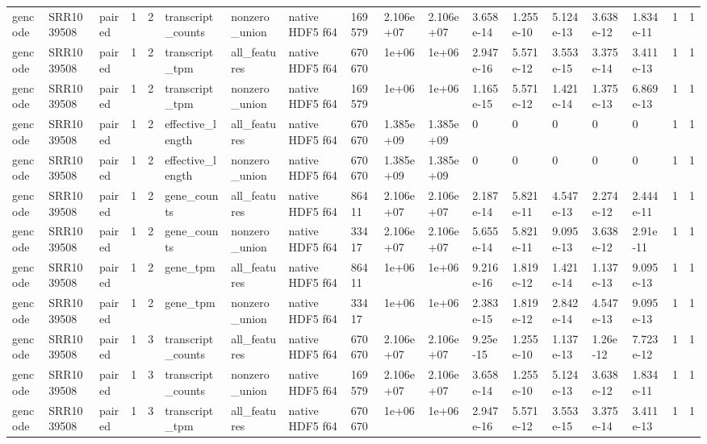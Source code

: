 \begin{tabular}{llllllllllllllllll}
gencode & SRR1039508 & paired & 1 & 2 & transcript\_counts & nonzero\_union & native HDF5 f64 & 169579 & 2.106e+07 & 2.106e+07 & 3.658e-14 & 1.255e-10 & 5.124e-13 & 3.638e-12 & 1.834e-11 & 1 & 1 \\
gencode & SRR1039508 & paired & 1 & 2 & transcript\_tpm & all\_features & native HDF5 f64 & 670670 & 1e+06 & 1e+06 & 2.947e-16 & 5.571e-12 & 3.553e-15 & 3.375e-14 & 3.411e-13 & 1 & 1 \\
gencode & SRR1039508 & paired & 1 & 2 & transcript\_tpm & nonzero\_union & native HDF5 f64 & 169579 & 1e+06 & 1e+06 & 1.165e-15 & 5.571e-12 & 1.421e-14 & 1.375e-13 & 6.869e-13 & 1 & 1 \\
gencode & SRR1039508 & paired & 1 & 2 & effective\_length & all\_features & native HDF5 f64 & 670670 & 1.385e+09 & 1.385e+09 & 0 & 0 & 0 & 0 & 0 & 1 & 1 \\
gencode & SRR1039508 & paired & 1 & 2 & effective\_length & nonzero\_union & native HDF5 f64 & 670670 & 1.385e+09 & 1.385e+09 & 0 & 0 & 0 & 0 & 0 & 1 & 1 \\
gencode & SRR1039508 & paired & 1 & 2 & gene\_counts & all\_features & native HDF5 f64 & 86411 & 2.106e+07 & 2.106e+07 & 2.187e-14 & 5.821e-11 & 4.547e-13 & 2.274e-12 & 2.444e-11 & 1 & 1 \\
gencode & SRR1039508 & paired & 1 & 2 & gene\_counts & nonzero\_union & native HDF5 f64 & 33417 & 2.106e+07 & 2.106e+07 & 5.655e-14 & 5.821e-11 & 9.095e-13 & 3.638e-12 & 2.91e-11 & 1 & 1 \\
gencode & SRR1039508 & paired & 1 & 2 & gene\_tpm & all\_features & native HDF5 f64 & 86411 & 1e+06 & 1e+06 & 9.216e-16 & 1.819e-12 & 1.421e-14 & 1.137e-13 & 9.095e-13 & 1 & 1 \\
gencode & SRR1039508 & paired & 1 & 2 & gene\_tpm & nonzero\_union & native HDF5 f64 & 33417 & 1e+06 & 1e+06 & 2.383e-15 & 1.819e-12 & 2.842e-14 & 4.547e-13 & 9.095e-13 & 1 & 1 \\
gencode & SRR1039508 & paired & 1 & 3 & transcript\_counts & all\_features & native HDF5 f64 & 670670 & 2.106e+07 & 2.106e+07 & 9.25e-15 & 1.255e-10 & 1.137e-13 & 1.26e-12 & 7.723e-12 & 1 & 1 \\
gencode & SRR1039508 & paired & 1 & 3 & transcript\_counts & nonzero\_union & native HDF5 f64 & 169579 & 2.106e+07 & 2.106e+07 & 3.658e-14 & 1.255e-10 & 5.124e-13 & 3.638e-12 & 1.834e-11 & 1 & 1 \\
gencode & SRR1039508 & paired & 1 & 3 & transcript\_tpm & all\_features & native HDF5 f64 & 670670 & 1e+06 & 1e+06 & 2.947e-16 & 5.571e-12 & 3.553e-15 & 3.375e-14 & 3.411e-13 & 1 & 1 \\

\end{tabular}
